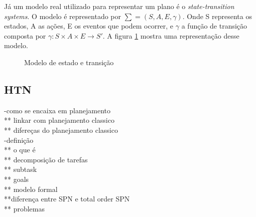 
Já um modelo real utilizado para representar um plano é o \textit{state-transition systems}. O modelo é representado por $\sum = (S, A, E, \gamma) $. Onde S representa os estados, A as ações, E os eventos que podem ocorrer, e $\gamma$ a função de transição composta por $ \gamma: S \times A \times E \rightarrow S'$. A figura \ref{fig:planmodelo} mostra uma representação desse modelo.

\begin{figure}[ht]
	\centering
	\caption{Modelo de estado e transição}
	\label{fig:planmodelo}
\end{figure} 







\subsection{HTN} 
-como se encaixa em planejamento \\ 
** linkar com planejamento classico\\
** difereças do planejamento classico\\
-definição \\
** o que é\\ 
** decomposição de tarefas \\
** subtask \\
** goals \\
** modelo formal \\
**diferença entre SPN e total order SPN \\
** problemas \\

